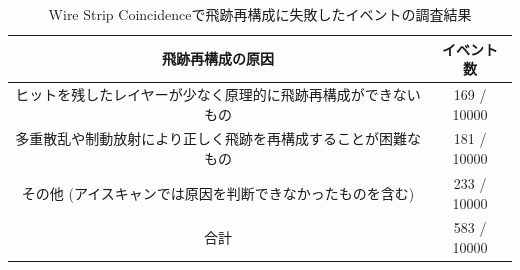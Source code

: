 \begin{table}[]
  \centering
  \caption{Wire Strip Coincidenceで飛跡再構成に失敗したイベントの調査結果}
  \label{tab:eyscan}
  \begin{tabular}{|c|c|}
  \hline
  飛跡再構成の原因                        & イベント数       \\ \hline\hline
  ヒットを残したレイヤーが少なく原理的に飛跡再構成ができないもの & 169 / 10000 \\ \hline
  多重散乱や制動放射により正しく飛跡を再構成することが困難なもの & 181 / 10000 \\ \hline
  その他 (アイスキャンでは原因を判断できなかったものを含む)  & 233 / 10000 \\ \hline
  合計                              & 583 / 10000 \\ \hline
  \end{tabular}
\end{table}




